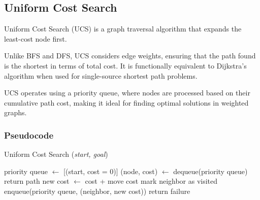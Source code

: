 \subsection{Uniform Cost Search}
\begin{flushleft}
	Uniform Cost Search (UCS) is a graph traversal algorithm that expands the least-cost node first.

	Unlike BFS and DFS, UCS considers edge weights, ensuring that the path found is the shortest in terms of total cost. It is functionally equivalent to Dijkstra's algorithm when used for single-source shortest path problems.

	UCS operates using a priority queue, where nodes are processed based on their cumulative path cost, making it ideal for finding optimal solutions in weighted graphs.
\end{flushleft}

\subsubsection{Pseudocode}
\begin{algorithm}[H]
	\caption{Uniform Cost Search (\textit{start, goal})}
	\label{alg:ucs}
	\begin{algorithmic}[1]
		\State priority queue \(\gets\) [(start, cost = 0)]
		\State (node, cost) \(\gets\) dequeue(priority queue)
		\State return path
		\EndIf
		\State new cost \(\gets\) cost + move cost
		\State mark neighbor as visited
		\State enqueue(priority queue, (neighbor, new cost))
		\EndIf
		\EndFor
		\EndWhile
		\State return failure
	\end{algorithmic}
\end{algorithm}


